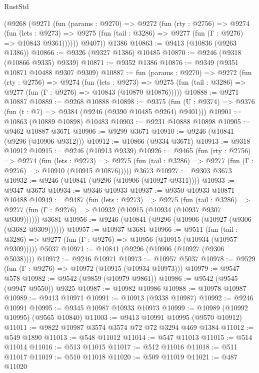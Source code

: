 \begin{lexlean}{RustStd}
\begin{coremodule}
{\begin{coremodule}
{{{{{{{{{{{{{{{{{{{{{{{{{{{{{{{{{      (@9268
        (@9271
          (fun (params : @9270) =>
          @9272
            (fun (rty : @2756) =>
            @9274
              (fun (lets : @9273) =>
              @9275 (fun (tail : @3286) => @9277 (fun (Γ : @9276) => @10843 @9361))))))
        @9407))
    @1386
@10863 := @9413 (@10836 (@9263 @1386))
@10866 := @9326 (@9327 @1386) @10485
@10870 := @9246 (@9318 (@10866 @9335) @9339)
@10871 := @9352 @1386
@10876 := @9349 (@9351 @10871 @10488 @9307 @9309)
@10887 := fun (params : @9270) =>
  @9272
    (fun (rty : @2756) =>
    @9274
      (fun (lets : @9273) =>
      @9275 (fun (tail : @3286) => @9277 (fun (Γ : @9276) => @10843 (@10870 @10876)))))
@10888 := @9271 @10887
@10889 := @9268 @10888
@10898 := @9375
    (fun (U : @9374) => @9376 (fun (t : @7) => @9384 (@9246 (@9390 @10485 @9264) @9401)))
@10901 := @10863 (@10889 @10898) @10483
@10903 := @9231 @10888 @10898
@10905 := @9462 @10887 @3671
@10906 := @9299 @3671
@10910 := @9246 (@10841 (@9296 (@10906 @9312)))
@10912 := @10866 (@9334 @3671)
@10913 := @9318 @10912
@10915 := @9246 (@10913 @9339)
@10926 := @9465
    (fun (rty : @2756) =>
    @9274
      (fun (lets : @9273) =>
      @9275 (fun (tail : @3286) => @9277 (fun (Γ : @9276) => @10910 (@10915 @10876)))))
    @3673
@10927 := @9303 @3673
@10932 := @9246 (@10841 (@9296 (@10906 (@10927 @9311))))
@10933 := @9347 @3673
@10934 := @9346 @10933
@10937 := @9350 @10933 @10871 @10488
@10949 := @9487
    (fun (lets : @9273) =>
    @9275
      (fun (tail : @3286) =>
      @9277 (fun (Γ : @9276) => @10932 (@10915 (@10934 (@10937 @9307 @9309))))))
    @3681
@10956 := @9246 (@10841 (@9296 (@10906 (@10927 (@9306 (@3682 @9309))))))
@10957 := @10937 @3681
@10966 := @9511
    (fun (tail : @3286) => @9277 (fun (Γ : @9276) => @10956 (@10915 (@10934 (@10957 @9309)))))
    @5037
@10971 := @10841 (@9296 (@10906 (@10927 (@9306 @5038))))
@10972 := @9246 @10971
@10973 := @10957 @5037
@10978 := @9529 (fun (Γ : @9276) => @10972 (@10915 (@10934 @10973)))
@10979 := @9547 @578
@10982 := @9542 (@9859 (@10979 @9861))
@10986 := @9542 (@9545 (@9947 @9550)) @9325
@10987 := @10982 @10986
@10988 := @10978 @10987
@10989 := @9413 @10971
@10991 := @10913 (@9338 @10987)
@10992 := @9246 @10991
@10995 := @9345 @10987 @10933 @10973
@10999 := @10989 (@10992 @10995) (@9565 @10840)
@11003 := @9413 @10991 @10995 (@9570 @10912)
@11011 := @9822 @10987 @3574 @3574 @72 @72 @3294 @469 @1384
@11012 := @549 @1890
@11013 := @548 @11012
@11014 := @547 @11013
@11015 := @514 @11014
@11016 := @513 @11015
@11017 := @512 @11016
@11018 := @511 @11017
@11019 := @510 @11018
@11020 := @509 @11019
@11021 := @487 @11020
}}}}}}}}}}}}}}}}}}}}}}}}}}}}}}}}}
\end{coremodule}}
\end{coremodule}
\end{lexlean}
